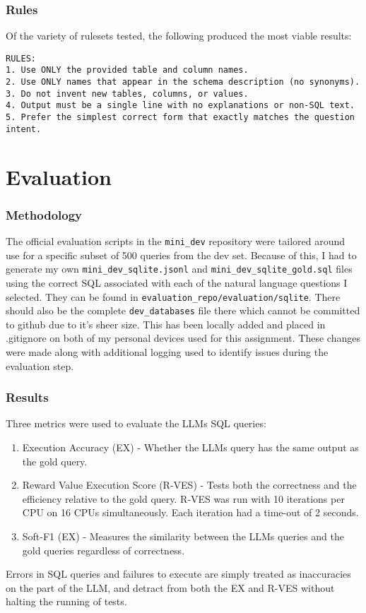 \documentclass[11pt]{article}
\begin{document}
\subsubsection{Rules}
Of the variety of rulesets tested, the following produced the most viable results:
\begin{verbatim}
RULES:
1. Use ONLY the provided table and column names.
2. Use ONLY names that appear in the schema description (no synonyms).
3. Do not invent new tables, columns, or values.
4. Output must be a single line with no explanations or non-SQL text.
5. Prefer the simplest correct form that exactly matches the question intent.
\end{verbatim}


\section{Evaluation}
\subsubsection{Methodology}
The official evaluation scripts in the \texttt{mini\_dev} repository were tailored around use for a specific subset of 500 queries from the dev set. Because of this, I had to generate my own \texttt{mini\_dev\_sqlite.jsonl} and \texttt{mini\_dev\_sqlite\_gold.sql} files using the correct SQL associated with each of the natural language questions I selected. They can be found in \texttt{evaluation\_repo/evaluation/sqlite}. There should also be the complete \texttt{dev\_databases} file there which cannot be committed to github due to it's sheer size. This has been locally added and placed in .gitignore on both of my personal devices used for this assignment. These changes were made along with additional logging used to identify issues during the evaluation step.

\subsubsection{Results}
Three metrics were used to evaluate the LLMs SQL queries: 
\begin{enumerate}
\item Execution Accuracy (EX) - Whether the LLMs query has the same output as the gold query.
\item Reward Value Execution Score (R-VES) - Tests both the correctness and the efficiency relative to the gold query. R-VES was run with 10 iterations per CPU on 16 CPUs simultaneously. Each iteration had a time-out of 2 seconds.
\item Soft-F1 (EX) - Measures the similarity between the LLMs queries and the gold queries regardless of correctness.
\end{enumerate}
Errors in SQL queries and failures to execute are simply treated as inaccuracies on the part of the LLM, and detract from both the EX and R-VES without halting the running of tests.
\end{document}
